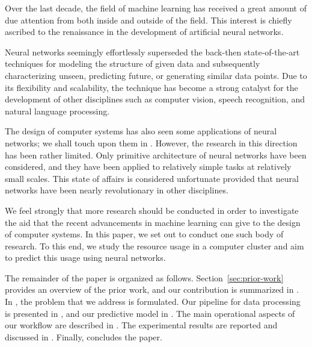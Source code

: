 Over the last decade, the field of machine learning has received a great amount
of due attention from both inside and outside of the field. This interest is
chiefly ascribed to the renaissance in the development of artificial neural
networks.

Neural networks seemingly effortlessly superseded the back-then state-of-the-art
techniques for modeling the structure of given data and subsequently
characterizing unseen, predicting future, or generating similar data points. Due
to its flexibility and scalability, the technique has become a strong catalyst
for the development of other disciplines such as computer vision, speech
recognition, and natural language processing.

The design of computer systems has also seen some applications of neural
networks; we shall touch upon them in . However, the research
in this direction has been rather limited. Only primitive architecture of neural
networks have been considered, and they have been applied to relatively simple
tasks at relatively small scales. This state of affairs is considered
unfortunate provided that neural networks have been nearly revolutionary in
other disciplines.

We feel strongly that more research should be conducted in order to investigate
the aid that the recent advancements in machine learning can give to the design
of computer systems. In this paper, we set out to conduct one such body of
research. To this end, we study the resource usage in a computer cluster and aim
to predict this usage using neural networks.

The remainder of the paper is organized as follows. Section~\ref{sec:prior-work}
provides an overview of the prior work, and our contribution is summarized in
. In , the problem that we address is
formulated. Our pipeline for data processing is presented in , and
our predictive model in . The main operational aspects of our
workflow are described in . The experimental results are
reported and discussed in . Finally,  concludes
the paper.
